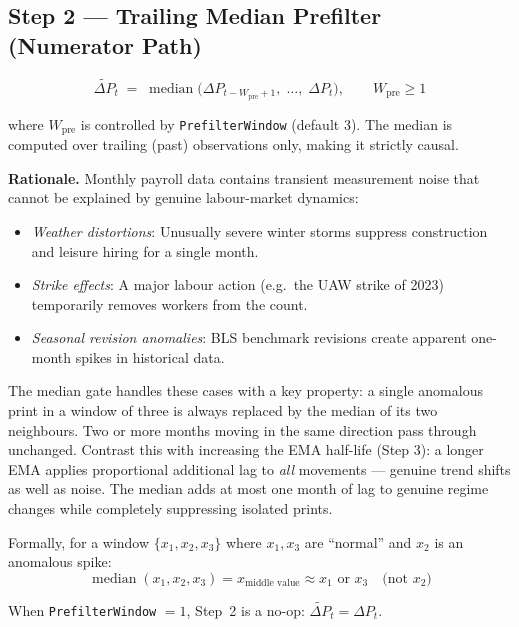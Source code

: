\documentclass[11pt, a4paper]{article}
\DeclareMathOperator{\Med}{median}
\newcommand{\dP}{\Delta P}
\begin{document}
\subsection{Step 2 — Trailing Median Prefilter (Numerator Path)}
\label{sec:step2}

\begin{equation}
  \tilde{\dP}_t \;=\; \Med\!\bigl(\dP_{t-W_{\mathrm{pre}}+1},\;\ldots,\;\dP_t\bigr),
  \qquad W_{\mathrm{pre}} \geq 1
\end{equation}

where $W_{\mathrm{pre}}$ is controlled by \texttt{PrefilterWindow}
(default 3). The median is computed over trailing (past) observations
only, making it strictly causal.

\textbf{Rationale.} Monthly payroll data contains transient
measurement noise that cannot be explained by genuine labour-market
dynamics:

\begin{itemize}[leftmargin=2em]
  \item \emph{Weather distortions}: Unusually severe winter storms
        suppress construction and leisure hiring for a single month.
  \item \emph{Strike effects}: A major labour action (e.g.\ the UAW
        strike of 2023) temporarily removes workers from the count.
  \item \emph{Seasonal revision anomalies}: BLS benchmark revisions
        create apparent one-month spikes in historical data.
\end{itemize}

The median gate handles these cases with a key property: a single
anomalous print in a window of three is always replaced by the median
of its two neighbours. Two or more months moving in the same
direction pass through unchanged. Contrast this with increasing the
EMA half-life (Step 3): a longer EMA applies proportional additional
lag to \emph{all} movements — genuine trend shifts as well as noise.
The median adds at most one month of lag to genuine regime changes
while completely suppressing isolated prints.

Formally, for a window $\{x_1, x_2, x_3\}$ where $x_1, x_3$ are
``normal'' and $x_2$ is an anomalous spike:
\begin{equation}
  \Med(x_1, x_2, x_3) = x_{\text{middle value}} \approx x_1 \text{ or } x_3
  \quad \text{(not } x_2)
\end{equation}

When \texttt{PrefilterWindow} $= 1$, Step~2 is a no-op:
$\tilde{\dP}_t = \dP_t$.
\end{document}
